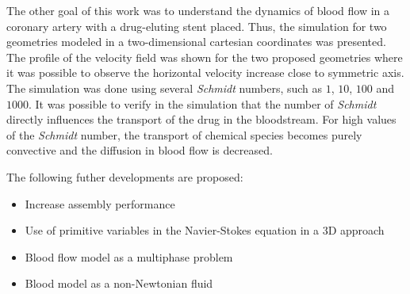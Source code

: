 \medskip
The other goal of this work was to understand the dynamics of blood 
flow in a coronary artery with 
a drug-eluting stent placed. Thus, the simulation for two geometries 
modeled in a two-dimensional cartesian coordinates was presented. 
The profile of the velocity field was shown for the two proposed 
geometries where it was possible to observe the horizontal
velocity increase close to symmetric axis. 
The simulation was done using several \textit{Schmidt} numbers, 
such as $1$, $10$, $100$ and $1000$. It was possible to verify in the 
simulation that the number of \textit{Schmidt} directly influences 
the transport of the drug in the bloodstream. For high values of 
the \textit{Schmidt} number, the transport of chemical species 
becomes purely convective and the diffusion in blood flow is decreased. 

\vspace{0.7cm}
\noindent
The following futher developments are proposed:

\begin{itemize}
 \vspace{-0.3cm}
 \item Increase assembly performance

 \item Use of primitive variables in the Navier-Stokes equation in a 3D approach
 
 \item Blood flow model as a multiphase problem

 \item Blood model as a non-Newtonian fluid
\end{itemize}








